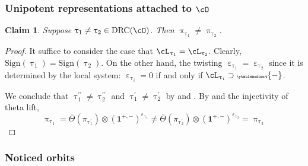 \documentclass[12pt,a4paper]{amsart}
\newcommand{\bfone}{\mathbf{1}}
\def\abs#1{\left|{#1}\right|}
\numberwithin{equation}{section}
\newtheorem{claim}[thm]{Claim}
\theoremstyle{remark}
\def\ssign{\mathrm{Sign}}
\def\Thetab{\bar{\Theta}}
\def\drc{\mathrm{DRC}}
\let\ytb=\ytableaushort
\newcommand{\tytb}[1]{{\tiny\ytb{#1}}}
\def\cOpp{\cO^{\prime\prime}}
\def\pcL{\cL^+}
\def\uptaup{\uptau^{\prime}}
\def\uptaupp{\uptau^{\prime\prime}}
\begin{document}




\subsubsection{Unipotent representations attached to $\cO$}

\begin{claim}\label{c:gd.D1}
  Suppose $\uptau_{1}\neq \uptau_{2}\in \drc(\cO)$. Then $\uppi_{\uptau_{1}}\neq \uppi_{\uptau_{2}}$.
\end{claim}
\begin{proof}
 It suffice to consider the case that $\cL_{\uptau_{1}}=\cL_{\uptau_{2}}$.
 Clearly, $\ssign(\uptau_{1})=\ssign(\uptau_{2})$. On the other hand,
 the twisting $\upepsilon_{\uptau_{1}}=\upepsilon_{\uptau_{2}}$ since it is
 determined by the  local system:
 $\upepsilon_{\uptau_{i}}=0$ if and only if $\cL_{\uptau_{i}}\supset \tytb{-}$.

 We conclude that $\uptaupp_{1}\neq \uptaupp_{2}$ and $\uptaup_{1}\neq \uptaup_{2}$
 by  and .
 By  and the injectivity of theta lift,
 \[
   \uppi_{\uptau_{1}} = \Thetab(\pi_{\uptaup_{1}})\otimes (\bfone^{+,-})^{\upepsilon_{\uptau_{1}}}
  \neq \Thetab(\pi_{\uptaup_{2}})\otimes (\bfone^{+,-})^{\upepsilon_{\uptau_{2}}} = \uppi_{\uptau_{2}}
 \]
\end{proof}


\subsubsection{Noticed orbits}

\end{document}
